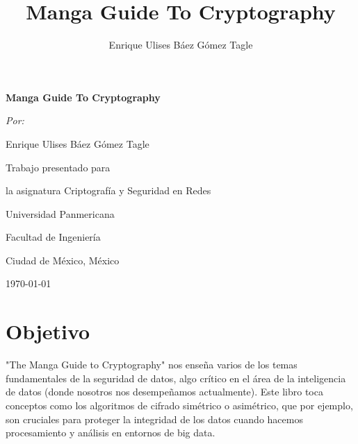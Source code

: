 \documentclass{article}
\begin{document}
\begin{titlepage}
    \centering

    \vspace{1cm}
    {\huge\bfseries Manga Guide To Cryptography\par}
    \vspace{2cm}
    
    {\Large\itshape Por:\par}
    \vspace{0.5cm}
    {\Large Enrique Ulises Báez Gómez Tagle\par}
    \vspace{1.5cm}
    
    {\large Trabajo presentado para\par}
    {\large la asignatura Criptografía y Seguridad en Redes\par}
    \vspace{1.5cm}
    
    {\large Universidad Panmericana\par}
    {\large Facultad de Ingeniería\par}
    {\large Ciudad de México, México\par}
    \vspace{1cm}
    {\large \today\par}
    
    \vfill
    
\end{titlepage}
\title{Manga Guide To Cryptography}

\author{Enrique Ulises Báez Gómez Tagle}

\maketitle
\tableofcontents
\newpage
\section{Objetivo}
"The Manga Guide to Cryptography" nos enseña varios de los temas fundamentales de la seguridad de datos, algo crítico en 
el área de la inteligencia de datos (donde nosotros nos desempeñamos actualmente). Este libro toca conceptos como los 
algoritmos de cifrado simétrico o asimétrico, que por ejemplo, son cruciales para proteger la integridad de los datos 
cuando hacemos procesamiento y análisis en entornos de big data.
\end{document}

